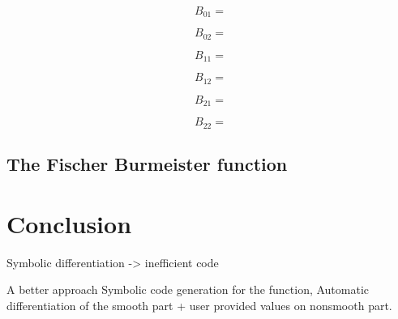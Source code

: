 \documentclass[a4paper]{article}
\begin{document}
\begin{equation}
  B_{01} = 
\end{equation}

\begin{equation}
  B_{02} = 
\end{equation}

\begin{equation}
  B_{11} = 
\end{equation}

\begin{equation}
  B_{12} = 
\end{equation}

\begin{equation}
  B_{21} = 
\end{equation}

\begin{equation}
  B_{22} = 
\end{equation}

\subsection{The Fischer Burmeister function}

\section{Conclusion}

Symbolic differentiation -> inefficient code

A better approach Symbolic code generation for the function, Automatic
differentiation of the smooth part + user provided values on nonsmooth part.





\end{document}

